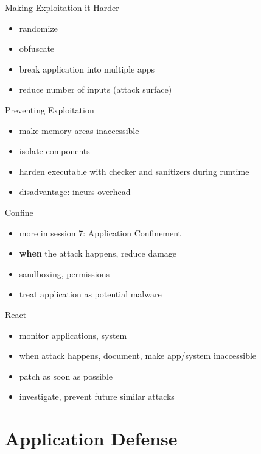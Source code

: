 \documentclass{curs}
\begin{document}
\begin{frame}{Making Exploitation it Harder}
  \begin{itemize}
    \item randomize
    \item obfuscate
    \item break application into multiple apps
    \item reduce number of inputs (attack surface)
  \end{itemize}
\end{frame}

\begin{frame}{Preventing Exploitation}
  \begin{itemize}
    \item make memory areas inaccessible
    \item isolate components
    \item harden executable with checker and sanitizers during runtime
    \item disadvantage: incurs overhead
  \end{itemize}
\end{frame}

\begin{frame}{Confine}
  \begin{itemize}
    \item more in session 7: Application Confinement
    \item \textbf{when} the attack happens, reduce damage
    \item sandboxing, permissions
    \item treat application as potential malware
  \end{itemize}
\end{frame}

\begin{frame}{React}
  \begin{itemize}
    \item monitor applications, system
    \item when attack happens, document, make app/system inaccessible
    \item patch as soon as possible
    \item investigate, prevent future similar attacks
  \end{itemize}
\end{frame}


\section{Application Defense}
\end{document}
